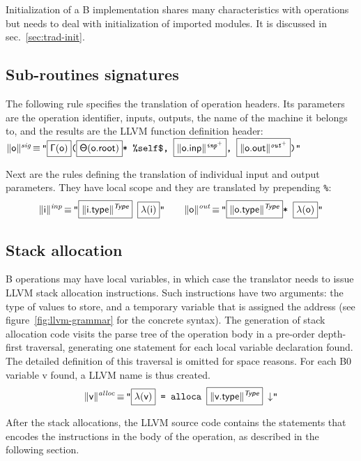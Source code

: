 \documentclass{llncs}
\newcommand{\trad}[2]{\ensuremath{\lVert \textsf{#1} \rVert^{\textit{#2}}}}
\newcommand{\nl}[0]{\ensuremath{\downarrow}}
\DeclareMathOperator{\isdef}{\equiv}
\newcommand{\llvm}[1]{\texttt{#1}}
\newcommand{\B}[1]{\textsf{#1}}
\newcommand{\ListOf}[1]{$\mbox{#1}^+$}
\newcommand{\PH}[1]{\framebox{$#1$}}
\newcommand{\Global}[0]{\ensuremath{\sf\Gamma}}
\newcommand{\local}[0]{\ensuremath{\sf\lambda}}
\newcommand{\state}[0]{\ensuremath{\sf\Theta}}
\newcommand{\self}[0]{\llvm{\%self\$}}
\begin{document}
Initialization of a B implementation shares many characteristics with operations
but needs to deal with initialization of imported modules. It is discussed in
sec.~\ref{sec:trad-init}.

\subsection{Sub-routines signatures}
\label{sec:trad-header}

The following rule specifies the translation of operation headers. Its
parameters are the operation identifier, inputs, outputs, the name of the
machine it belongs to, and the results are the LLVM function definition
header: \\
\noindent$\trad{\B{o}}{sig} \isdef \llvm{"\PH{\Global(\B{o})}(\PH{\state(\B{o.root})}* \self, \PH{\trad{\B{o.inp}}{\ListOf{inp}}}, \PH{\trad{\B{o.out}}{\ListOf{out}}})"}$

Next are the rules defining the translation of individual input and output
parameters. They have local scope and they are translated by prepending
\llvm{\%}:
\begin{align*}
  \trad{i}{inp} \isdef
  \llvm{"\PH{\trad{i.type}{\B{Type}}} \PH{\local(\B{i})}"} \quad \quad
  \trad{o}{out} \isdef
  \llvm{"\PH{\trad{o.type}{\B{Type}}}* \PH{\local(\B{o})}"}
\end{align*}

\subsection{Stack allocation}
\label{sec:trad-alloc}

B operations may have local variables, in which case the translator needs to
issue LLVM stack allocation instructions. Such instructions have two arguments:
the type of values to store, and a temporary variable that is assigned the
address (see figure~\ref{fig:llvm-grammar} for the concrete syntax). The
generation of stack allocation code visits the parse tree of the operation body
in a pre-order depth-first traversal, generating one statement for each local
variable declaration found. The detailed definition of this traversal is omitted
for space reasons. For each B0 variable \B{v} found, a LLVM name is thus
created.
\begin{align*}
  \trad{v}{alloc} \isdef
  \llvm{"\PH{\local(\B{v})} = alloca \PH{\trad{v.type}{\B{Type}}} \nl"}
\end{align*}

After the stack allocations, the LLVM source code contains the statements that
encodes the instructions in the body of the operation, as described in the
following section.
\end{document}
